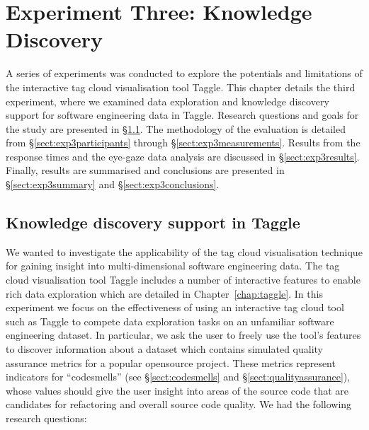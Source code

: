 \chapter[Experiment Three: Knowledge Discovery]{Experiment Three: Knowledge Discovery}
\label{chap:exp3}
\ifpdf
    \graphicspath{{Chapters/ExperimentThree/Exp3Figs/PNG/}{Chapters/ExperimentThree/Exp3Figs/PDF/}{Chapters/ExperimentThree/Exp3Figs/}}
\else
    \graphicspath{{Chapters/ExperimentThree/Exp3Figs/EPS/}{Chapters/ExperimentThree/Exp3Figs/}}
\fi  

A series of experiments was conducted to explore the potentials and limitations of the interactive tag cloud visualisation tool Taggle. This chapter details the third experiment, where we examined data exploration and knowledge discovery support for software engineering data in Taggle.  Research questions and goals for the study are presented in \S\ref{sect:experimentthree}. The methodology of the evaluation is detailed from \S\ref{sect:exp3participants} through \S\ref{sect:exp3measurements}. Results from the response times and the eye-gaze data analysis are discussed in \S\ref{sect:exp3results}. Finally, results are summarised and conclusions are presented in \S\ref{sect:exp3summary} and \S\ref{sect:exp3conclusions}.

\section{Knowledge discovery support in Taggle}\label{sect:experimentthree}

We wanted to investigate the applicability of the tag cloud visualisation technique for gaining insight into multi-dimensional software engineering data. The tag cloud visualisation tool Taggle includes a number of interactive features to enable rich data exploration which are detailed in Chapter~\ref{chap:taggle}. In this experiment we focus on the effectiveness of using an interactive tag cloud tool such as Taggle to compete data exploration tasks on an unfamiliar software engineering dataset. In particular, we ask the user to freely use the tool's features to discover information about a dataset which contains simulated quality assurance metrics for a popular opensource project. These metrics represent indicators for ``codesmells'' (see \S\ref{sect:codesmells} and \S\ref{sect:qualityassurance}), whose values should give the user insight into areas of the source code that are candidates for refactoring and overall source code quality. We had the following research questions:

